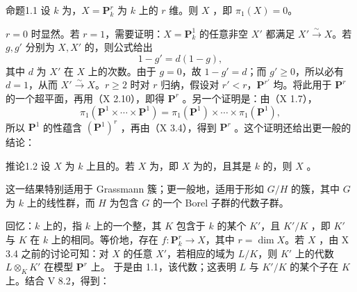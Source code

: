 \begin{SGAresult}{命题}{1.1}
设 $k$ 为，$X=\mathbf P_k^r$ 为 $k$ 上的 $r$ 维。则 $X$ ，即 $\pi_1(X)=0$。
\end{SGAresult}
$r=0$ 时显然。若 $r=1$，需要证明：$X=\mathbf P_k^1$ 的任意非空 $X'$ 都满足 $X'\xrightarrow{\sim}X$。若 $g,g'$ 分别为 $X,X'$ 的，则公式给出
\[
1-g'=d(1-g),
\]
其中 $d$ 为 $X'$ 在 $X$ 上的次数。由于 $g=0$，故 $1-g'=d$；而 $g'\geq0$，所以必有 $d=1$，从而 $X'\xrightarrow{\sim}X$。$r\geq2$ 时对 $r$ 归纳，假设对 $r'<r$，$\mathbf P^{r'}$ 均。将此用于 $\mathbf P^r$ 的一个超平面，再用（X 2.10），即得 $\mathbf P^r$ 。另一个证明是：由（X 1.7），
\[
\pi_1(\mathbf P^1\times\cdots\times\mathbf P^1)
=\pi_1(\mathbf P^1)\times\cdots\times\pi_1(\mathbf P^1),
\]
所以 $\mathbf P^1$ 的性蕴含 $(\mathbf P^1)^r$ ，再由（X 3.4），得到 $\mathbf P^r$ 。这个证明还给出更一般的结论：

\begin{SGAresult}{推论}{1.2}
设 $X$ 为 $k$ 上且的。若 $X$ 为，即 $X$ 为的，且其是 $k$ 的，则 $X$ 。
\end{SGAresult}
这一结果特别适用于 Grassmann 簇；更一般地，适用于形如 $G/H$ 的簇，其中 $G$ 为 $k$ 上的线性群，而 $H$ 为包含 $G$ 的一个 Borel 子群的代数子群。

回忆：$k$ 上的，指 $k$ 上的一个整，其 $K$ 包含于 $k$ 的某个 $K'$，且 $K'/K$ ，即 $K'$ 与 $K$ 在 $k$ 上的相同。等价地，存在 $f:\mathbf P_k^r\to X$，其中 $r=\dim X$。若 $X$ ，由 X 3.4 之前的讨论可知：对 $X$ 的任意 $X'$，若相应的域为 $L/K$，则 $K'$ 上的代数 $L\otimes_KK'$ 在模型 $\mathbf P^r$ 上。
于是由 1.1，该代数；这表明 $L$ 与 $K'/K$ 的某个子在 $K$ 上。结合 V 8.2，得到：

